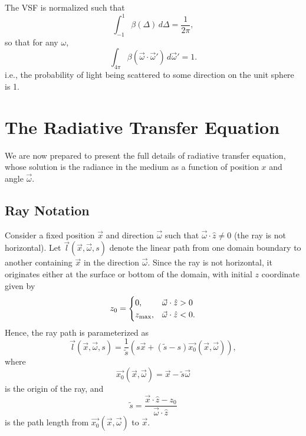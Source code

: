 The VSF is normalized such that
\begin{equation*}
  \int_{-1}^1\beta(\Delta)\, d\Delta=\frac{1}{2\pi},
\end{equation*}
so that for any $\omega$,
\begin{equation*}
  \int_{4\pi}\beta(\vec{\omega}\cdot\vec{\omega}')\, d\vec{\omega}' = 1.
\end{equation*}
i.e., the probability of light being scattered to some direction on the unit sphere is 1.

\section{The Radiative Transfer Equation}
We are now prepared to present the full details of radiative transfer equation, whose solution is the radiance in the medium as a function of position $x$ and angle $\vec{\omega}$.

\subsection{Ray Notation}
Consider a fixed position $\vec{x}$ and direction $\vec{\omega}$ such that
$\vec{\omega} \cdot \hat{z} \neq 0$ (the ray is not horizontal).
Let $\vec{l}(\vec{x}, \vec{\omega}, s)$ denote the linear path from one domain boundary to another containing $\vec{x}$ in the direction $\vec{\omega}$.
Since the ray is not horizontal, it originates either at the surface or bottom of the domain, with initial $z$ coordinate given by
\begin{equation*}
  z_0 =
   \begin{cases}
    0, & \vec{\omega} \cdot \hat{z} > 0 \\
    {z_{\max}}, & \vec{\omega} \cdot \hat{z} < 0.
  \end{cases}
\end{equation*}
Hence, the ray path is parameterized as
\begin{equation}
  \vec{l}(\vec{x}, \vec{\omega}, s) = \frac{1}{\tilde{s}} (s\vec{x} + (\tilde{s} - s)\vec{x_0}(\vec{x}, \vec{\omega})),
  \label{eqn:ray_path}
\end{equation}
where
\begin{equation}
  \vec{x_0}(\vec{x}, \vec{\omega}) = \vec{x} - \tilde{s} \vec{\omega}
  \label{eqn:x_0}
\end{equation}
is the origin of the ray, and
\begin{equation*}
  \tilde{s} = \frac{\vec{x} \cdot \hat{z} - z_0}{\vec{\omega} \cdot \hat{z}}
\end{equation*}
is the path length from $\vec{x_0}(\vec{x}, \vec{\omega})$ to $\vec{x}$.

